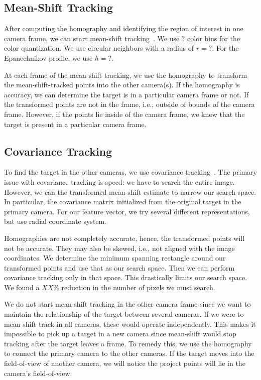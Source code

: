 \documentclass{article}
\begin{document}
\subsection{Mean-Shift Tracking}
\label{sec:meanshift}
After computing the homography and identifying the region of interest in one camera frame, we can start mean-shift tracking~\cite{comaniciu2003kernel}. We use $?$ color bins for the color quantization. We use circular neighbors with a radius of $r=?$. For the Epanechnikov profile, we use $h=?$.

At each frame of the mean-shift tracking, we use the homography to transform the mean-shift-tracked points into the other camera(s). If the homography is accuracy, we can determine the target is in a particular camera frame or not. If the transformed points are not in the frame, i.e., outside of bounds of the camera frame. However, if the points lie inside of the camera frame, we know that the target is present in a particular camera frame.

\subsection{Covariance Tracking}
\label{sec:covariance}
To find the target in the other cameras, we use covariance tracking~\cite{porikli2006covariance}. The primary issue with covariance tracking is speed: we have to search the entire image. However, we can the transformed mean-shift estimate to narrow our search space. In particular, the covariance matrix initialized from the original target in the primary camera. For our feature vector, we try several different representations, but use radial coordinate system.

Homographies are not completely accurate, hence, the transformed points will not be accurate. They may also be skewed, i.e., not aligned with the image coordinates. We determine the minimum spanning rectangle around our transformed points and use that as our search space. Then we can perform covariance tracking only in that space. This drastically limits our search space. We found a $XX\%$ reduction in the number of pixels we must search.

We do not start mean-shift tracking in the other camera frame since we want to maintain the relationship of the target between several cameras. If we were to mean-shift track in all cameras, these would operate independently. This makes it impossible to pick up a target in a new camera since mean-shift would stop tracking after the target leaves a frame. To remedy this, we use the homography to connect the primary camera to the other cameras. If the target moves into the field-of-view of another camera, we will notice the project points will lie in the camera's field-of-view.
\end{document}
